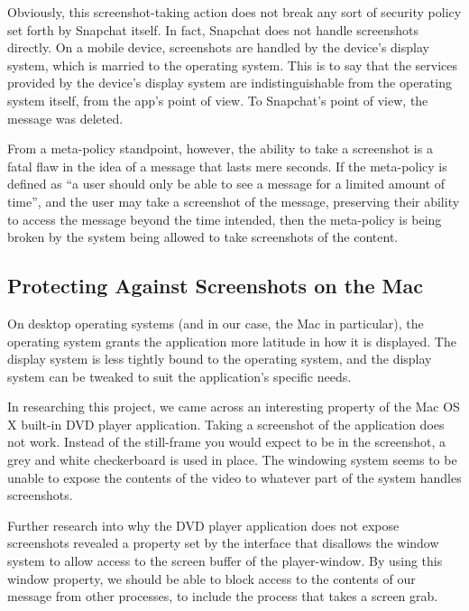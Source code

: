 \documentclass[11pt, a4paper,titlepage]{report}
\begin{document}
Obviously, this screenshot-taking action does not break any sort of security policy set forth by Snapchat itself. In fact, Snapchat does not handle screenshots directly. On a mobile device, screenshots are handled by the device's display system, which is married to the operating system. This is to say that the services provided by the device's display system are indistinguishable from the operating system itself, from the app's point of view. To Snapchat's point of view, the message was deleted.

From a meta-policy standpoint, however, the ability to take a screenshot is a fatal flaw in the idea of a message that lasts mere seconds. If the meta-policy is defined as ``a user should only be able to see a message for a limited amount of time'', and the user may take a screenshot of the message, preserving their ability to access the message beyond the time intended, then the meta-policy is being broken by the system being allowed to take screenshots of the content.

\subsection*{Protecting Against Screenshots on the Mac}
On desktop operating systems (and in our case, the Mac in particular), the operating system grants the application more latitude in how it is displayed. The display system is less tightly bound to the operating system, and the display system can be tweaked to suit the application's specific needs.

In researching this project, we came across an interesting property of the Mac OS X built-in DVD player application. Taking a screenshot of the application does not work. Instead of the still-frame you would expect to be in the screenshot, a grey and white checkerboard %
is used in place. The windowing system seems to be unable to expose the contents of the video to whatever part of the system handles screenshots.

Further research into why the DVD player application does not expose screenshots revealed a property set by the interface that disallows the window system to allow access to the screen buffer of the player-window. %
By using this window property, we should be able to block access to the contents of our message from other processes, to include the process that takes a screen grab.
\end{document}
